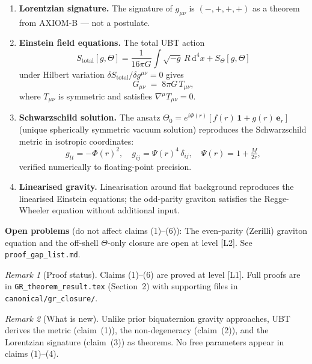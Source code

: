 \documentclass[12pt,a4paper]{article}
\theoremstyle{remark}
\newtheorem{remark}{Remark}
\begin{document}
\begin{tcolorbox}[enhanced,colback=blue!4!white,colframe=blue!55!black,
  arc=3pt,boxrule=1.2pt,
  title={\textbf{\large Main Theorem — GR Recovery (T1\_GR)}}]
\begin{enumerate}[label=\textbf{(\arabic*)}]
  \item \textbf{Lorentzian signature.}  The signature of $g_{\mu\nu}$ is
        $(-,+,+,+)$ as a theorem from AXIOM-B — not a postulate.

  \item \textbf{Einstein field equations.}  The total UBT action
        \[
          S_{\mathrm{total}}[g,\Theta]
          = \frac{1}{16\pi G}\int\!\!\sqrt{-g}\,R\,\mathrm{d}^4x
          + S_\Theta[g,\Theta]
        \]
        under Hilbert variation $\delta S_{\mathrm{total}}/\delta g^{\mu\nu} = 0$ gives
        \[
          G_{\mu\nu} \;=\; 8\pi G\,T_{\mu\nu},
        \]
        where $T_{\mu\nu}$ is symmetric and satisfies $\nabla^\mu T_{\mu\nu} = 0$.

  \item \textbf{Schwarzschild solution.}  The ansatz
        $\Theta_0 = e^{i\Phi(r)}[f(r)\,\mathbf{1} + g(r)\,\boldsymbol{e}_r]$
        (unique spherically symmetric vacuum solution) reproduces the Schwarzschild
        metric in isotropic coordinates:
        \[
          g_{tt} = -\Phi(r)^2, \quad
          g_{ij} = \Psi(r)^4\,\delta_{ij}, \quad
          \Psi(r) = 1 + \tfrac{M}{2r},
        \]
        verified numerically to floating-point precision.

  \item \textbf{Linearised gravity.}  Linearisation around flat background
        reproduces the linearised Einstein equations; the odd-parity graviton
        satisfies the Regge-Wheeler equation without additional input.

\end{enumerate}

\smallskip
\textbf{Open problems} (do not affect claims (1)--(6)):
The even-parity (Zerilli) graviton equation and the off-shell $\Theta$-only
closure are open at level [L2].  See \texttt{proof\_gap\_list.md}.

\end{tcolorbox}

\bigskip
\begin{remark}[Proof status]
Claims (1)--(6) are proved at level [L1].  Full proofs are in
\texttt{GR\_theorem\_result.tex} (Section~2) with supporting files in
\texttt{canonical/gr\_closure/}.
\end{remark}

\begin{remark}[What is new]
Unlike prior biquaternion gravity approaches, UBT derives the metric (claim~(1)),
the non-degeneracy (claim~(2)), and the Lorentzian signature (claim~(3)) as
theorems.  No free parameters appear in claims (1)--(4).
\end{remark}

\ifdefined\INCLUDEMODE
\else
  
\end{document}
